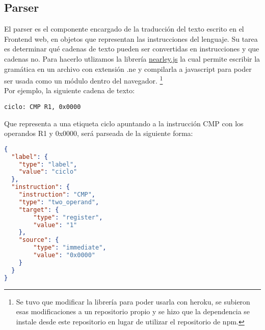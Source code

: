 \documentclass{article}
\begin{document}
\nopagebreak
\subsection*{Parser}
El parser es el componente encargado de la traducción del texto escrito en el Frontend web, en objetos que representan las instrucciones del lenguaje. Su tarea es determinar qué cadenas de texto pueden ser convertidas en instrucciones y que cadenas no. Para hacerlo utlizamos la librería \href{https://nearley.js.org/}{nearley.js} la cual permite escribir la gramática en un archivo con extensión .ne y compilarla a javascript para poder ser usada como un módulo dentro del navegador. \footnote{Se tuvo que modificar la librería para poder usarla con heroku, se subieron esas modificaciones a un repositorio propio y se hizo que la dependencia se instale desde este repositorio en lugar de utilizar el repositorio de npm.}\\

Por ejemplo, la siguiente cadena de texto:
\begin{center}
\texttt{ciclo: CMP R1, 0x0000}
\end{center}

Que representa a una etiqueta ciclo apuntando a la instrucción CMP con los operandos R1 y 0x0000, será parseada de la siguiente forma:

\begin{minipage}{\textwidth} 
\begin{lstlisting}[language=json,firstnumber=0]
{
  "label": {
  	"type": "label",
  	"value": "ciclo"
  },
  "instruction": {
    "instruction": "CMP",
    "type": "two_operand",
    "target": {
    	"type": "register",
    	"value": "1"
    },
    "source": {
    	"type": "immediate",
    	"value": "0x0000"
    }
  }
}
\end{lstlisting}
\end{minipage}
\end{document}
